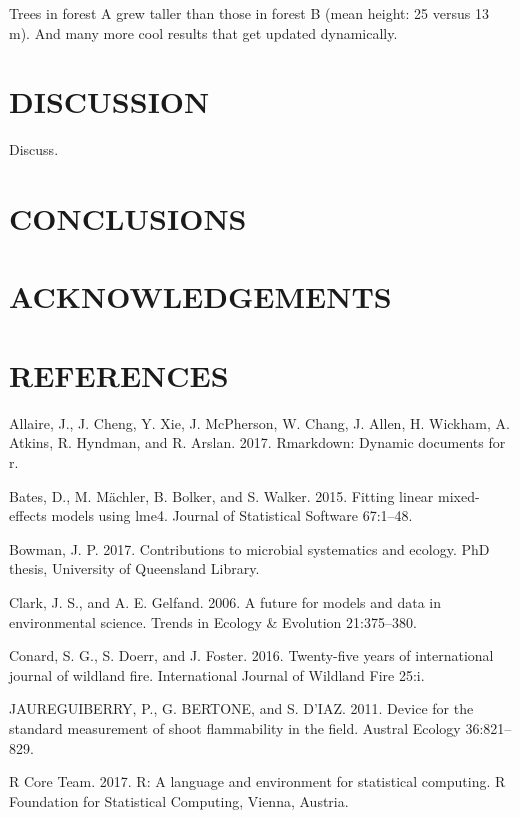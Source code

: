 \documentclass[11pt,a4paper]{article}
\begin{document}
Trees in forest A grew taller than those in forest B (mean height: 25
versus 13 m). And many more cool results that get updated dynamically.

\section{DISCUSSION}\label{discussion}

Discuss.

\section{CONCLUSIONS}\label{conclusions}

\section{ACKNOWLEDGEMENTS}\label{acknowledgements}

\section{REFERENCES}\label{references}

\hypertarget{refs}{}
\hypertarget{ref-Allaire_2017}{}
Allaire, J., J. Cheng, Y. Xie, J. McPherson, W. Chang, J. Allen, H.
Wickham, A. Atkins, R. Hyndman, and R. Arslan. 2017. Rmarkdown: Dynamic
documents for r.

\hypertarget{ref-Bates_2015}{}
Bates, D., M. Mächler, B. Bolker, and S. Walker. 2015. Fitting linear
mixed-effects models using lme4. Journal of Statistical Software
67:1--48.

\hypertarget{ref-Bowman}{}
Bowman, J. P. 2017. Contributions to microbial systematics and ecology.
PhD thesis, University of Queensland Library.

\hypertarget{ref-Clark_2006}{}
Clark, J. S., and A. E. Gelfand. 2006. A future for models and data in
environmental science. Trends in Ecology \& Evolution 21:375--380.

\hypertarget{ref-Conard_2016}{}
Conard, S. G., S. Doerr, and J. Foster. 2016. Twenty-five years of
international journal of wildland fire. International Journal of
Wildland Fire 25:i.

\hypertarget{ref-JAUREGUIBERRY_2011}{}
JAUREGUIBERRY, P., G. BERTONE, and S. D\a'IAZ. 2011. Device for the
standard measurement of shoot flammability in the field. Austral Ecology
36:821--829.

\hypertarget{ref-R_Core_Team_2017}{}
R Core Team. 2017. R: A language and environment for statistical
computing. R Foundation for Statistical Computing, Vienna, Austria.
\end{document}
